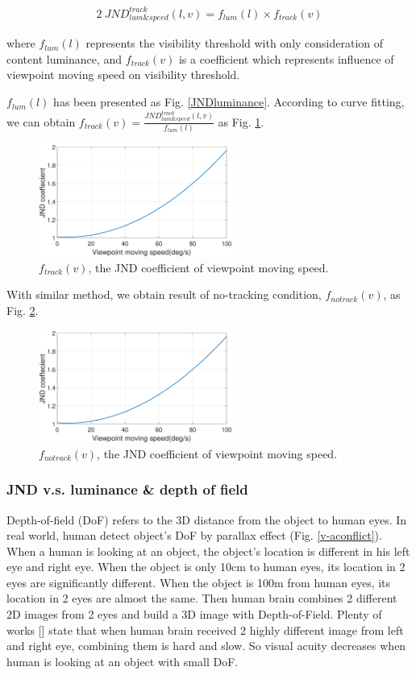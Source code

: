 \begin{alignat}{2}\
JND_{lum\&speed}^{track}(l, v) = f_{lum}(l) \times f_{track}(v)
\end{alignat}

where $f_{lum}(l)$ represents the visibility threshold with only consideration of content luminance, and $f_{track}(v)$ is a coefficient which represents influence of viewpoint moving speed on visibility threshold.

$f_{lum}(l)$ has been presented as Fig. \ref{JNDluminance}. According to curve fitting, we can obtain $f_{track}(v) = \frac{JND_{lum\&speed}^{track}(l, v)}{f_{lum}(l)}$ as Fig. \ref{JNDspeed-track}.

\begin{figure}
  \centering
  \includegraphics[width=2.5in]{images/JNDspeed.eps}
  \caption{$f_{track}(v)$, the JND coefficient of viewpoint moving speed.}
  \label{JNDspeed-track}
  \end{figure}

With similar method, we obtain result of no-tracking condition, $f_{notrack}(v)$, as Fig. \ref{JNDspeed-notrack}.

\begin{figure}
  \centering
  \includegraphics[width=2.5in]{images/JNDspeed.eps}
  \caption{$f_{notrack}(v)$, the JND coefficient of viewpoint moving speed.}
  \label{JNDspeed-notrack}
  \end{figure}

\subsubsection{JND v.s. luminance \& depth of field}

Depth-of-field (DoF) refers to the 3D distance from the object to human eyes. In real world, human detect object's DoF by parallax effect (Fig. \ref{v-aconflict}). When a human is looking at an object, the object's location is different in his left eye and right eye. When the object is only 10cm to human eyes, its location in 2 eyes are significantly different. When the object is 100m from human eyes, its location in 2 eyes are almost the same. Then human brain combines 2 different 2D images from 2 eyes and build a 3D image with Depth-of-Field. Plenty of works [] state that when human brain received 2 highly different image from left and right eye, combining them is hard and slow. So visual acuity decreases when human is looking at an object with small DoF.

